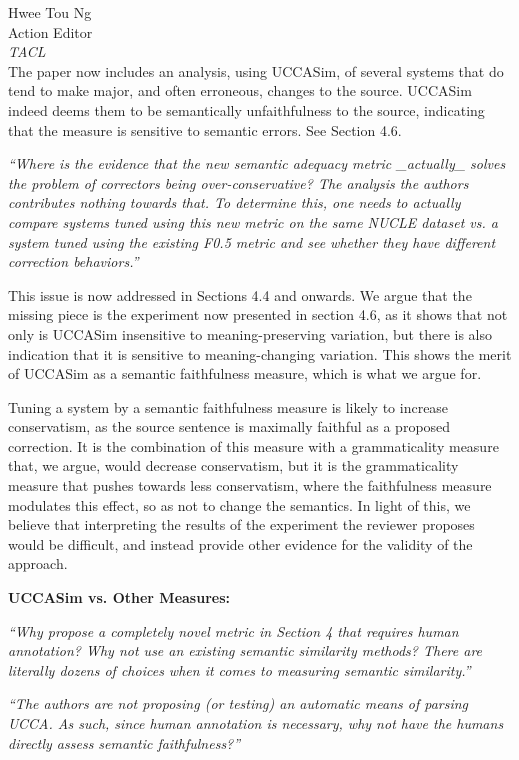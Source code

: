\documentclass[11pt,letterpaper]{letter}
\begin{document}
\begin{letter}{%
Hwee Tou Ng\\
Action Editor\\
{\em TACL}\\
}
The paper now includes an analysis, using UCCASim, of several systems that do tend to
make major, and often erroneous, changes to the source. UCCASim indeed deems them to be semantically
unfaithfulness to the source, indicating that the measure is sensitive to semantic errors. See Section 4.6.

\emph{``Where is the evidence that the new semantic adequacy metric \_actually\_
	solves the problem of correctors being over-conservative? The analysis the
	authors contributes nothing towards that. To determine this, one needs to
	actually compare systems tuned using this new metric on the same NUCLE
	dataset vs. a system tuned using the existing F0.5 metric and see whether
	they have different correction behaviors.''
	}

This issue is now addressed in Sections 4.4 and onwards.
We argue that the missing piece is the experiment now presented in section 4.6, as it shows that not only is UCCASim insensitive to meaning-preserving variation, but there is also indication that it is sensitive to meaning-changing variation. This shows the merit of UCCASim as a semantic faithfulness measure, which is what we argue for.

Tuning a system by a semantic faithfulness measure is likely to increase conservatism, as the source sentence is maximally faithful as a proposed correction. It is the combination of this measure with a grammaticality measure that, we argue, would decrease conservatism, but it is the grammaticality measure that pushes towards less conservatism, where the faithfulness measure modulates this effect, so as not to change the semantics. In light of this, we believe that interpreting the results of the experiment the reviewer proposes would be difficult, and instead provide other evidence for the validity of the approach.


\vspace{.5cm}
{\large\bf UCCASim vs. Other Measures:}

\emph{``Why propose a completely novel metric in Section 4 that requires human
	annotation? Why not use an existing semantic similarity methods? There are
	literally dozens of choices when it comes to measuring semantic similarity.''}

	\emph{``The authors are not proposing (or
	testing) an automatic means of parsing UCCA. As such, since human annotation
	is necessary, why not have the humans directly assess semantic faithfulness?''}


\end{letter}
\end{document}
